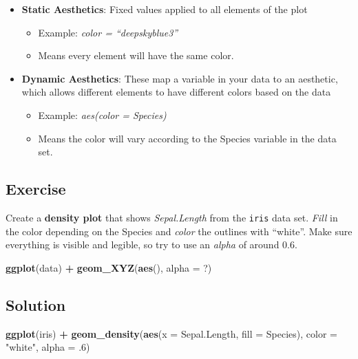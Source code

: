 \documentclass[
]{book}
\newenvironment{Shaded}{\begin{snugshade}}{\end{snugshade}}
\newcommand{\AttributeTok}[1]{\textcolor[rgb]{0.13,0.29,0.53}{#1}}
\newcommand{\DecValTok}[1]{\textcolor[rgb]{0.00,0.00,0.81}{#1}}
\newcommand{\FunctionTok}[1]{\textcolor[rgb]{0.13,0.29,0.53}{\textbf{#1}}}
\newcommand{\NormalTok}[1]{#1}
\newcommand{\SpecialCharTok}[1]{\textcolor[rgb]{0.81,0.36,0.00}{\textbf{#1}}}
\newcommand{\StringTok}[1]{\textcolor[rgb]{0.31,0.60,0.02}{#1}}
\providecommand{\tightlist}{%
  \setlength{\itemsep}{0pt}\setlength{\parskip}{0pt}}
\begin{document}
\begin{itemize}
\tightlist
\item
  \textbf{Static Aesthetics}: Fixed values applied to all elements of the plot

  \begin{itemize}
  \tightlist
  \item
    Example: \emph{color = ``deepskyblue3''}
  \item
    Means every element will have the same color.
  \end{itemize}
\item
  \textbf{Dynamic Aesthetics}: These map a variable in your data to an aesthetic, which allows different elements to have different colors based on the data

  \begin{itemize}
  \tightlist
  \item
    Example: \emph{aes(color = Species)}
  \item
    Means the color will vary according to the Species variable in the data set.
  \end{itemize}
\end{itemize}

\subsection{Exercise}\label{exercise-1}

Create a \textbf{density plot} that shows \emph{Sepal.Length} from the \texttt{iris} data set.
\emph{Fill} in the color depending on the Species and \emph{color} the outlines with ``white''.
Make sure everything is visible and legible, so try to use an \emph{alpha} of around 0.6.

\begin{Shaded}
\begin{Highlighting}[]
\FunctionTok{ggplot}\NormalTok{(data) }\SpecialCharTok{+} 
  \FunctionTok{geom\_XYZ}\NormalTok{(}\FunctionTok{aes}\NormalTok{(), }\AttributeTok{alpha =}\NormalTok{ ?)}
\end{Highlighting}
\end{Shaded}

\subsection{Solution}\label{solution}

\begin{Shaded}
\begin{Highlighting}[]
\FunctionTok{ggplot}\NormalTok{(iris) }\SpecialCharTok{+} 
  \FunctionTok{geom\_density}\NormalTok{(}\FunctionTok{aes}\NormalTok{(}\AttributeTok{x =}\NormalTok{ Sepal.Length, }\AttributeTok{fill =}\NormalTok{ Species), }
               \AttributeTok{color =} \StringTok{"white"}\NormalTok{, }\AttributeTok{alpha =}\NormalTok{ .}\DecValTok{6}\NormalTok{)}
\end{Highlighting}
\end{Shaded}
\end{document}
